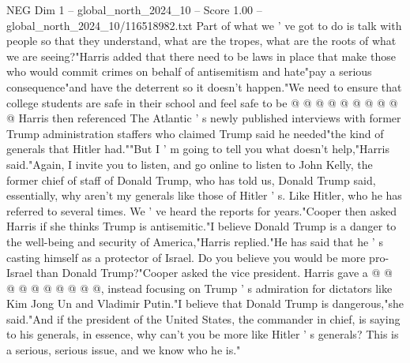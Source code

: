\begin{textsample}{NEG Dim 1 – global\_north\_2024\_10 – Score 1.00 – global\_north\_2024\_10/116518982.txt}
Part of what we ' ve got to do is talk with people so that they understand, what are the tropes, what are the roots of what we are seeing?"Harris added that there need to be laws in place that make those who would commit crimes on behalf of antisemitism and hate"pay a serious consequence"and have the deterrent so it doesn't happen."We need to ensure that college students are safe in their school and feel safe to be @ @ @ @ @ @ @ @ @ @ Harris then referenced The Atlantic ' s newly published interviews with former Trump administration staffers who claimed Trump said he needed"the kind of generals that Hitler had.""But I ' m going to tell you what doesn't help,"Harris said."Again, I invite you to listen, and go online to listen to John Kelly, the former chief of staff of Donald Trump, who has told us, Donald Trump said, essentially, why aren't my generals like those of Hitler ' s.
Like Hitler, who he has referred to several times.
We ' ve heard the reports for years."Cooper then asked Harris if she thinks Trump is antisemitic."I believe Donald Trump is a danger to the well-being and security of America,"Harris replied."He has said that he ' s casting himself as a protector of Israel.
Do you believe you would be more pro-Israel than Donald Trump?"Cooper asked the vice president.
Harris gave a @ @ @ @ @ @ @ @ @ @, instead focusing on Trump ' s admiration for dictators like Kim Jong Un and Vladimir Putin."I believe that Donald Trump is dangerous,"she said."And if the president of the United States, the commander in chief, is saying to his generals, in essence, why can't you be more like Hitler ' s generals?
This is a serious, serious issue, and we know who he is."

\end{textsample}
